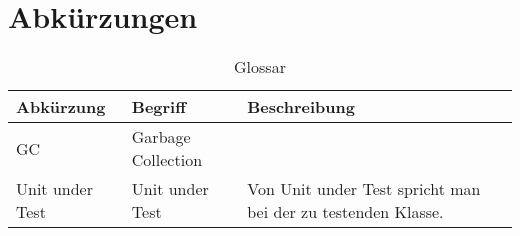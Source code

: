 \chapter*{Abkürzungen}\label{abkuerzungen}
  \begin{longtable}{|p{3cm}|p{5cm}|p{6cm}|}
      \caption{Glossar}\\
\hline
  \textbf{Abkürzung} &\textbf{Begriff} &  \textbf{Beschreibung} \\\hline
  GC & Garbage Collection & \\\hline
Unit under Test & Unit under Test & Von Unit under Test spricht man bei der zu testenden Klasse.\\\hline
  \end{longtable}


